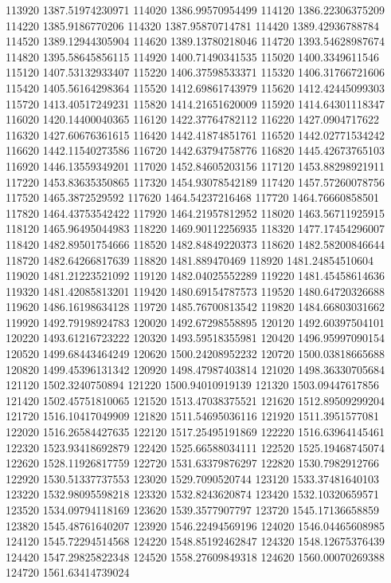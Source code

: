 {113920 1387.51974230971
114020 1386.99570954499
114120 1386.22306375209
114220 1385.9186770206
114320 1387.95870714781
114420 1389.42936788784
114520 1389.12944305904
114620 1389.13780218046
114720 1393.54628987674
114820 1395.58645856115
114920 1400.71490341535
115020 1400.3349611546
115120 1407.53132933407
115220 1406.37598533371
115320 1406.31766721606
115420 1405.56164298364
115520 1412.69861743979
115620 1412.42445099303
115720 1413.40517249231
115820 1414.21651620009
115920 1414.64301118347
116020 1420.14400040365
116120 1422.37764782112
116220 1427.0904717622
116320 1427.60676361615
116420 1442.41874851761
116520 1442.02771534242
116620 1442.11540273586
116720 1442.63794758776
116820 1445.42673765103
116920 1446.13559349201
117020 1452.84605203156
117120 1453.88298921911
117220 1453.83635350865
117320 1454.93078542189
117420 1457.57260078756
117520 1465.3872529592
117620 1464.54237216468
117720 1464.76660858501
117820 1464.43753542422
117920 1464.21957812952
118020 1463.56711925915
118120 1465.96495044983
118220 1469.90112256935
118320 1477.17454296007
118420 1482.89501754666
118520 1482.84849220373
118620 1482.58200846644
118720 1482.64266817639
118820 1481.889470469
118920 1481.24854510604
119020 1481.21223521092
119120 1482.04025552289
119220 1481.45458614636
119320 1481.42085813201
119420 1480.69154787573
119520 1480.64720326688
119620 1486.16198634128
119720 1485.76700813542
119820 1484.66803031662
119920 1492.79198924783
120020 1492.67298558895
120120 1492.60397504101
120220 1493.61216723222
120320 1493.59518355981
120420 1496.95997090154
120520 1499.68443464249
120620 1500.24208952232
120720 1500.03818665688
120820 1499.45396131342
120920 1498.47987403814
121020 1498.36330705684
121120 1502.3240750894
121220 1500.94010919139
121320 1503.09447617856
121420 1502.45751810065
121520 1513.47038375521
121620 1512.89509299204
121720 1516.10417049909
121820 1511.54695036116
121920 1511.3951577081
122020 1516.26584427635
122120 1517.25495191869
122220 1516.63964145461
122320 1523.93418692879
122420 1525.66588034111
122520 1525.19468745074
122620 1528.11926817759
122720 1531.63379876297
122820 1530.7982912766
122920 1530.51337737553
123020 1529.7090520744
123120 1533.37481640103
123220 1532.98095598218
123320 1532.8243620874
123420 1532.10320659571
123520 1534.09794118169
123620 1539.3577907797
123720 1545.17136658859
123820 1545.48761640207
123920 1546.22494569196
124020 1546.04465608985
124120 1545.72294514568
124220 1548.85192462847
124320 1548.12675376439
124420 1547.29825822348
124520 1558.27609849318
124620 1560.00070269388
124720 1561.63414739024
}
